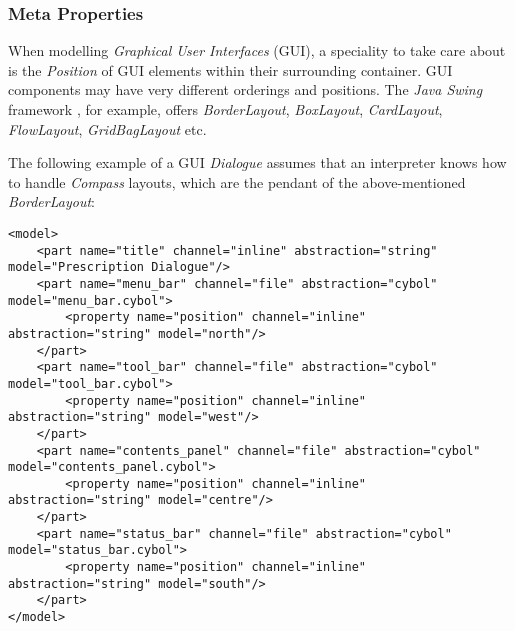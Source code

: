 %
%
%
%
%
%
%

\subsubsection{Meta Properties}
\label{meta_properties_heading}

When modelling \emph{Graphical User Interfaces} (GUI), a speciality to take
care about is the \emph{Position} of GUI elements within their surrounding
container. GUI components may have very different orderings and positions. The
\emph{Java Swing} framework \cite{java}, for example, offers \emph{BorderLayout},
\emph{BoxLayout}, \emph{CardLayout}, \emph{FlowLayout}, \emph{GridBagLayout} etc.

The following example of a GUI \emph{Dialogue} assumes that an interpreter
knows how to handle \emph{Compass} layouts, which are the pendant of the
above-mentioned \emph{BorderLayout}:

\begin{scriptsize}
    \begin{verbatim}
<model>
    <part name="title" channel="inline" abstraction="string" model="Prescription Dialogue"/>
    <part name="menu_bar" channel="file" abstraction="cybol" model="menu_bar.cybol">
        <property name="position" channel="inline" abstraction="string" model="north"/>
    </part>
    <part name="tool_bar" channel="file" abstraction="cybol" model="tool_bar.cybol">
        <property name="position" channel="inline" abstraction="string" model="west"/>
    </part>
    <part name="contents_panel" channel="file" abstraction="cybol" model="contents_panel.cybol">
        <property name="position" channel="inline" abstraction="string" model="centre"/>
    </part>
    <part name="status_bar" channel="file" abstraction="cybol" model="status_bar.cybol">
        <property name="position" channel="inline" abstraction="string" model="south"/>
    </part>
</model>
    \end{verbatim}
\end{scriptsize}

